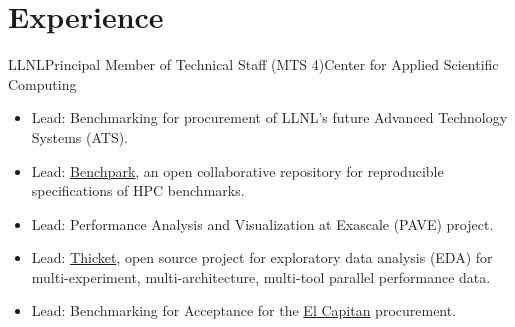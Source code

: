 \section{Experience}

		{LLNL}{Principal Member of Technical Staff (MTS 4)}{Center for Applied Scientific Computing}{}
		{\begin{itemize}
		      \item %
		      	Lead: Benchmarking for procurement of LLNL's future Advanced Technology Systems (ATS).  
		      \item Lead:  \href{https://github.com/LLNL/benchpark}{Benchpark}, 
		      	an open collaborative repository for reproducible specifications of HPC benchmarks.
		      \item Lead: Performance Analysis and Visualization at Exascale (PAVE) project.
		      \item Lead: \href{https://thicket.readthedocs.io/en/latest/}{Thicket}, open source project for
		      	exploratory data analysis (EDA) for multi-experiment, multi-architecture, multi-tool parallel performance data.
		      \item Lead: Benchmarking for Acceptance for the 
		      	\href{https://www.llnl.gov/news/llnl-and-hpe-partner-amd-el-capitan-projected-worlds-fastest-supercomputer}{El Capitan}
			procurement.
		 \end{itemize}
		}
